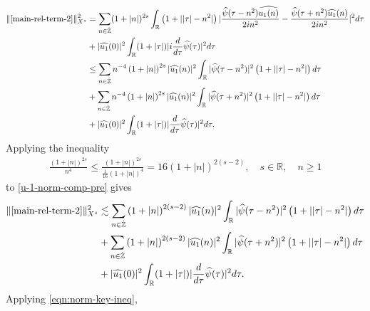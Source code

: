 \documentclass[12pt,reqno]{amsart}
\numberwithin{equation}{section}  %
\newcommand{\rr}{\mathbb{R}}
\newcommand{\zz}{\mathbb{Z}}
\newcommand{\zzdot}{\dot{\zz}}
\newcommand{\wh}{\widehat}
\begin{document}
\begin{equation}
  \begin{split}
    \| \eqref{main-rel-term-2} \|_{X^{s}}^{2} 
    & = \sum_{n \in \zzdot}(1 + |n|)^{2s} \int_{\rr}\left( 1 + | | \tau
    |-n^{2} | \right) | \frac{\wh{\psi}(\tau - n^{2})\wh{u_{1}(n)}}{2i
    n^{2}} -
    \frac{\wh{\psi}(\tau + n^{2})\wh{u_{1}}(n)}{2i n^{2}} |^{2} d \tau
    \\
    & + |\wh{u_{1}}(0)|^{2} \int_{\rr} (1 + | \tau |) | i \frac{d }{d \tau}
    \wh{\psi}(\tau)|^{2} d \tau
    \\
    & \le \sum_{n \in \dot{\zz}} n^{-4} \left( 1 + |n| \right)^{2s} | \wh{u_{1}}(n)
    |^{2} \int_{\rr} | \wh{\psi}(\tau - n^{2}) |^{2}\left( 1 + | | \tau | -
    n^{2} | \right) d \tau
    \\
    & + \sum_{n \in \dot{\zz}} n^{-4} \left( 1 + |n| \right)^{2s} | \wh{u_{1}}(n)
    |^{2} \int_{\rr} | \wh{\psi}(\tau + n^{2}) |^{2}\left( 1 + | | \tau | -
    n^{2} | \right) d \tau
    \\
    & + |\wh{u_{1}}(0)|^{2} \int_{\rr} (1 + | \tau |) |\frac{d }{d \tau}
    \wh{\psi}(\tau)|^2 d \tau.
\end{split}
\label{u-1-norm-comp-pre}
\end{equation}
%
%
Applying the inequality
%
%
\begin{equation*}
\begin{split}
  \frac{(1 + |n|)^{2s}}{ n^{4}} \le \frac{(1 + |n|)^{2s}}{\frac{1}{16}(1 +
  |n|)^{4}} = 16 (1 + | n |)^{2(s-2)},  \quad s \in \rr, \quad n \ge 1
\end{split}
\end{equation*}
%
to \eqref{u-1-norm-comp-pre} gives
%
\begin{equation}
  \begin{split}
    \|  \eqref{main-rel-term-2}\|_{X^{s}}^{2} 
    & \lesssim \sum_{n \in \dot{\zz}} \left( 1 + |n| \right)^{2(s-2)} | \wh{u_{1}}(n)
    |^{2} \int_{\rr} | \wh{\psi}(\tau - n^{2}) |^{2}\left( 1 + | | \tau | -
    n^{2} | \right) d \tau
    \\
    & + \sum_{n \in \dot{\zz}} \left( 1 + |n| \right)^{2(s-2)} | \wh{u_{1}}(n)
    |^{2} \int_{\rr} | \wh{\psi}(\tau + n^{2}) |^{2}\left( 1 + | | \tau | -
    n^{2} | \right) d \tau
    \\
    & + |\wh{u_{1}}(0)|^{2} \int_{\rr} (1 + | \tau |) |\frac{d }{d \tau}
    \wh{\psi}(\tau)|^2 d \tau.
\end{split}
\label{u-1-norm-comp}
\end{equation}
%
%
Applying \eqref{eqn:norm-key-ineq},
\end{document}
